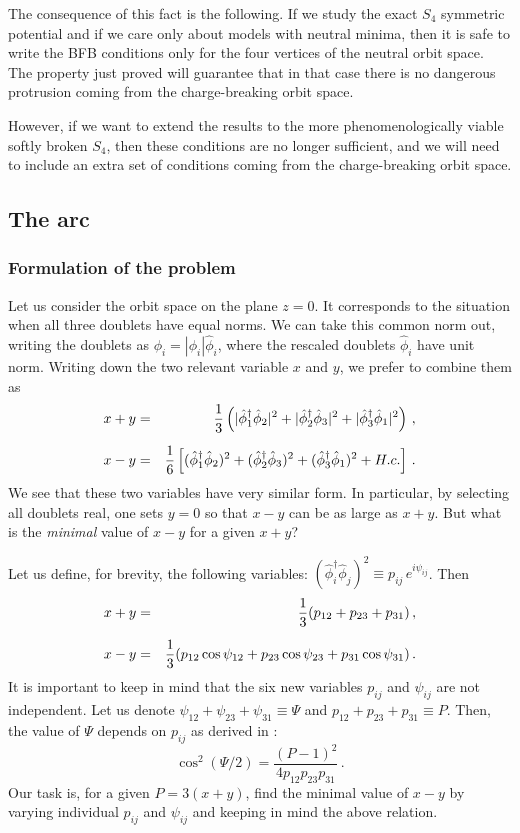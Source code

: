 \documentclass[11pt]{article}
\begin{document}
The consequence of this fact is the following.
If we study the exact $S_4$ symmetric potential and if we care only about models with neutral minima,
then it is safe to write the BFB conditions only for the four vertices of the neutral orbit space.
The property just proved will guarantee that in that case there is no dangerous protrusion coming from 
the charge-breaking orbit space.

However, if we want to extend the results to the more phenomenologically viable softly broken $S_4$,
then these conditions are no longer sufficient, and we will need to include an extra set of conditions
coming from the charge-breaking orbit space.

\subsection{The arc}\label{appendix:S4.arc}

\subsubsection{Formulation of the problem}

Let us consider the orbit space on the plane $z=0$.
It corresponds to the situation when all three doublets have equal norms.
We can take this common norm out, writing the doublets as
$\phi_i = |\phi_i| \hat\phi_i$, where the rescaled doublets $\hat\phi_i$ have unit norm.
Writing down the two relevant variable $x$ and $y$, we prefer to combine them as 
\begin{eqnarray}
x+y &=& {1 \over 3}\left(|\hat\phi_1^\dagger\hat\phi_2|^2 + |\hat\phi_2^\dagger\hat\phi_3|^2 + |\hat\phi_3^\dagger\hat\phi_1|^2\right)\,,\nonumber\\[2mm]
x-y &=& {1 \over 6}\left[(\hat\phi_1^\dagger\hat\phi_2)^2 + (\hat\phi_2^\dagger\hat\phi_3)^2 + (\hat\phi_3^\dagger\hat\phi_1)^2 + H.c.\right]\,.
\end{eqnarray}
We see that these two variables have very similar form.
In particular, by selecting all doublets real, one sets $y=0$ so that $x-y$ can be as large as $x+y$.
But what is the {\em minimal} value of $x-y$ for a given $x+y$?

Let us define, for brevity, the following variables:
$(\hat\phi_i^\dagger\hat\phi_j)^2 \equiv p_{ij}\,e^{i\psi_{ij}}$.
Then
\begin{eqnarray}
x+y &=& {1 \over 3}(p_{12}+p_{23}+p_{31})\,, \nonumber\\[2mm]
x-y &=& {1 \over 3}(p_{12}\cos\psi_{12} + p_{23}\cos\psi_{23} + p_{31}\cos\psi_{31})\,. 
\end{eqnarray}
It is important to keep in mind that the six new variables $p_{ij}$ and $\psi_{ij}$
are not independent. Let us denote $\psi_{12}+\psi_{23}+\psi_{31} \equiv \Psi$ 
and $p_{12}+p_{23}+p_{31} \equiv P$.
Then, the value of $\Psi$ depends on $p_{ij}$ as derived in \cite{Faro:2019vcd}:
\begin{equation}
\cos^2(\Psi/2) = \frac{(P - 1)^2}{4p_{12}p_{23}p_{31}}\,.
\label{relation-Faro}
\end{equation}
Our task is, for a given $P = 3(x+y)$, find the minimal value of $x-y$ by varying individual $p_{ij}$
and $\psi_{ij}$ and keeping in mind the above relation.
\end{document}
